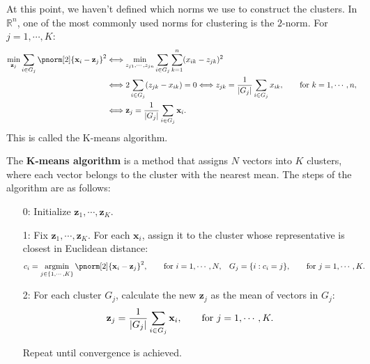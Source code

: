 \documentclass{huhtakm-template-book-v2}
\DeclareMathOperator*{\argmin}{argmin}
\begin{document}
    At this point, we haven't defined which norms we use to construct the clusters. In $\mathbb{R}^{n}$, one of the most commonly used norms for clustering is the $2$-norm. For $j = 1, \cdots, K$:
    \begin{align*}
        \min_{\mathbf{z}_{j}}\sum_{i \in G_{j}}\pnorm[2]{\mathbf{x}_{i} - \mathbf{z}_{j}}^{2} &\Longleftrightarrow \min_{z_{j1}, \cdots, z_{jn}}\sum_{i \in G_{j}}\sum_{k=1}^{n}(x_{ik} - z_{jk})^{2}\\
        &\Longleftrightarrow 2\sum_{i \in G_{j}}(z_{jk} - x_{ik}) = 0 \Longleftrightarrow z_{jk} = \frac{1}{\abs{G_{j}}}\sum_{i \in G_{j}}x_{ik}, \qquad \text{for } k = 1, \cdots, n,\\
        &\Longleftrightarrow \mathbf{z}_{j} = \frac{1}{\abs{G_{j}}}\sum_{i \in G_{j}}\mathbf{x}_{i}.
    \end{align*}
    This is called the K-means algorithm.
    \begin{defn}
        The \textbf{K-means algorithm} is a method that assigns $N$ vectors into $K$ clusters, where each vector belongs to the cluster with the nearest mean. The steps of the algorithm are as follows:
        \begin{itemize}
            \item[0:] Initialize $\mathbf{z}_{1}, \cdots, \mathbf{z}_{K}$.
            \item[1:] Fix $\mathbf{z}_{1}, \cdots, \mathbf{z}_{K}$. For each $\mathbf{x}_{i}$, assign it to the cluster whose representative is closest in Euclidean distance:
            \begin{align*}
                c_{i} &= \argmin_{j \in \{1, \cdots, K\}}\pnorm[2]{\mathbf{x}_{i} - \mathbf{z}_{j}}^{2}, \qquad \text{for } i = 1, \cdots, N, & G_{j} &= \{i : c_{i} = j\}, \qquad \text{for } j = 1, \cdots, K.
            \end{align*}
            \item[2:] For each cluster $G_{j}$, calculate the new $\mathbf{z}_{j}$ as the mean of vectors in $G_{j}$:
            \begin{equation*}
                \mathbf{z}_{j} = \frac{1}{\left|{G_{j}}\right|}\sum_{i \in G_{j}}\mathbf{x}_{i}, \qquad \text{for } j = 1, \cdots, K.
            \end{equation*}
            \item[] Repeat until convergence is achieved.
        \end{itemize}
    \end{defn}
    \newpage
\end{document}
